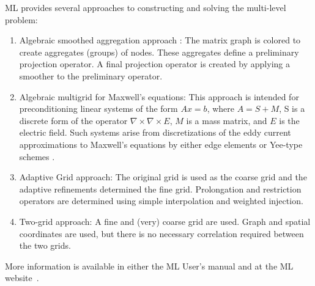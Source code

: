 \documentclass[acmtoms,acmnow]{acmtrans2m}
\begin{document}
ML provides several approaches to constructing and solving the multi-level
problem:
\begin{enumerate}
\item Algebraic smoothed aggregation approach \cite{Vanek:96,Vanek:98}:  The
 matrix graph is colored to create aggregates (groups) of nodes.
These aggregates define a preliminary projection operator.
A final projection operator is created by applying a smoother to the
 preliminary operator.
%
\item Algebraic multigrid for Maxwell's equations:
 This approach is
intended for preconditioning linear systems of the form $Ax=b$, where $A=S+M$,
S is a discrete form of the operator $\nabla\times\nabla\times E$,
 $M$ is a mass matrix, and $E$ is the electric field.
Such systems arise from discretizations of the eddy current approximations to
Maxwell's equations by either edge elements or Yee-type schemes
\cite{Bochev:03a,Yee:66}.


%
\item Adaptive Grid approach: The original grid is used as the coarse grid and
the adaptive refinements determined the fine grid.
Prolongation and restriction operators are determined using simple interpolation
and weighted injection.
%
\item Two-grid approach: A fine and (very) coarse grid are used.
Graph and spatial coordinates are used, 
but there is no necessary correlation required between the two grids.
\end{enumerate}

%
More information is available in either the ML User's manual
\cite{TuminaroTong:00a} and at the ML website~\cite{ML-home-page}.
\end{document}
